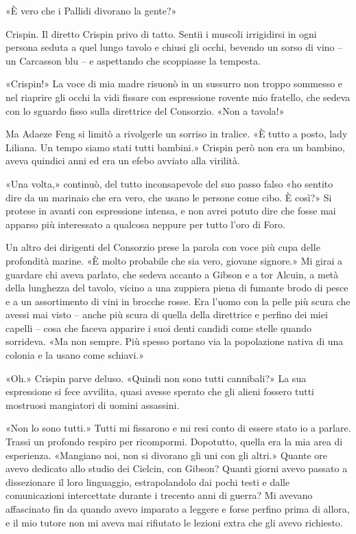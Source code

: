 «È vero che i Pallidi divorano la gente?»

Crispin. Il diretto Crispin privo di tatto. Sentii i muscoli irrigidirsi
in ogni persona seduta a quel lungo tavolo e chiusi gli occhi, bevendo
un sorso di vino -- un Carcasson blu -- e aspettando che scoppiasse la
tempesta.

«Crispin!» La voce di mia madre risuonò in un sussurro non troppo
sommesso e nel riaprire gli occhi la vidi fissare con espressione
rovente mio fratello, che sedeva con lo sguardo fisso sulla direttrice
del Consorzio. «Non a tavola!»

Ma Adaeze Feng si limitò a rivolgerle un sorriso in tralice. «È tutto a
posto, lady Liliana. Un tempo siamo stati tutti bambini.» Crispin però
non era un bambino, aveva quindici anni ed era un efebo avviato alla
virilità.

«Una volta,» continuò, del tutto inconsapevole del suo passo falso «ho
sentito dire da un marinaio che era vero, che usano le persone come
cibo. È così?» Si protese in avanti con espressione intensa, e non avrei
potuto dire che fosse mai apparso più interessato a qualcosa neppure per
tutto l'oro di Foro.

Un altro dei dirigenti del Consorzio prese la parola con voce più cupa
delle profondità marine. «È molto probabile che sia vero, giovane
signore.» Mi girai a guardare chi aveva parlato, che sedeva accanto a
Gibson e a tor Alcuin, a metà della lunghezza del tavolo, vicino a una
zuppiera piena di fumante brodo di pesce e a un assortimento di vini in
brocche rosse. Era l'uomo con la pelle più scura che avessi mai visto --
anche più scura di quella della direttrice e perfino dei miei capelli --
cosa che faceva apparire i suoi denti candidi come stelle quando
sorrideva. «Ma non sempre. Più spesso portano via la popolazione nativa
di una colonia e la usano come schiavi.»

«Oh.» Crispin parve deluso. «Quindi non sono tutti cannibali?» La sua
espressione si fece avvilita, quasi avesse sperato che gli alieni
fossero tutti mostruosi mangiatori di uomini assassini.

«Non lo sono tutti.» Tutti mi fissarono e mi resi conto di essere stato
io a parlare. Trassi un profondo respiro per ricompormi. Dopotutto,
quella era la mia area di esperienza. «Mangiano noi, non si divorano gli
uni con gli altri.» Quante ore avevo dedicato allo studio dei Cielcin,
con Gibson? Quanti giorni avevo passato a dissezionare il loro
linguaggio, estrapolandolo dai pochi testi e dalle comunicazioni
intercettate durante i trecento anni di guerra? Mi avevano affascinato
fin da quando avevo imparato a leggere e forse perfino prima di allora,
e il mio tutore non mi aveva mai rifiutato le lezioni extra che gli
avevo richiesto.

